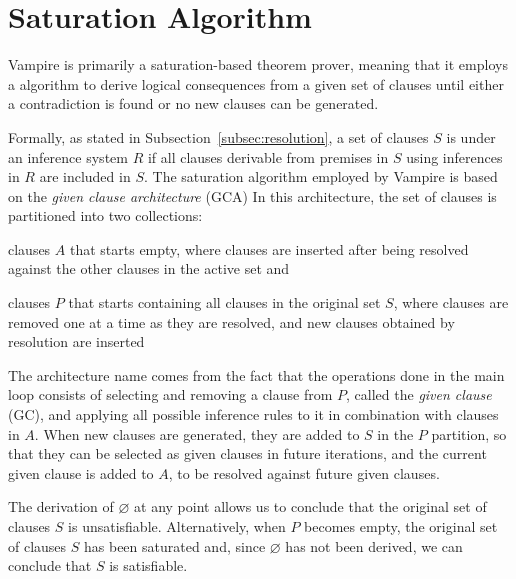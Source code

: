 \section{Saturation Algorithm}\label{sec:saturation-algorithm}

Vampire is primarily a saturation-based theorem prover, meaning that it employs a  algorithm to derive logical consequences from a given set of clauses until either a contradiction is found or no new clauses can be generated.

Formally, as stated in Subsection~\ref{subsec:resolution}, a set of clauses \(S\) is  under an inference system \(R\) if all clauses derivable from premises in \(S\) using inferences in \(R\) are included in \(S\).
The saturation algorithm employed by Vampire is based on the \emph{given clause architecture} (GCA)
In this architecture, the set of clauses is partitioned into two collections:

\begin{enumerate*}[label= (\roman*)]
  \item {} clauses \(A\) that starts empty, where clauses are inserted after being resolved against the other clauses in the active set and
  \item {} clauses \(P\) that starts containing all clauses in the original set \(S\), where clauses are removed one at a time as they are resolved, and new clauses obtained by resolution are inserted
\end{enumerate*}

The architecture name comes from the fact that the operations done in the main loop consists of selecting and removing a clause from \(P\), called the \emph{given clause} (GC), and applying all possible inference rules to it in combination with clauses in \(A\).
When new clauses are generated, they are added to \(S\) in the \(P\) partition, so that they can be selected as given clauses in future iterations, and the current given clause is added to \(A\), to be resolved against future given clauses.

The derivation of \(\varnothing\) at any point allows us to conclude that the original set of clauses \(S\) is unsatisfiable.
Alternatively, when \(P\) becomes empty, the original set of clauses \(S\) has been saturated and, since \(\varnothing\) has not been derived, we can conclude that \(S\) is satisfiable.

